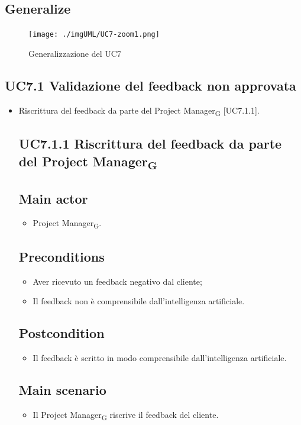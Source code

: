 \documentclass{article}
\begin{document}
    \subsection*{Generalize}
      \begin{figure}[h]
            \centering
            \texttt{[image: ./imgUML/UC7-zoom1.png]}
            \caption{Generalizzazione del UC7}
            \label{fig:UC7_generalizzazione}
        \end{figure}
    \subsection{UC7.1 Validazione del feedback non approvata}
    \begin{itemize}
        \item Riscrittura del feedback da parte del Project Manager\textsubscript{G}  [UC7.1.1].
        \subsection*{UC7.1.1 Riscrittura del feedback da parte del Project Manager\textsubscript{G} }
     \subsection*{Main actor}
         \begin{itemize}
             \item Project Manager\textsubscript{G}.
         \end{itemize}
     \subsection*{Preconditions} 
        \begin{itemize}
            \item Aver ricevuto un feedback negativo dal cliente;
            \item Il feedback non è comprensibile dall'intelligenza artificiale.
        \end{itemize}
        \subsection*{Postcondition} 
        \begin{itemize}
            \item Il feedback è scritto in modo comprensibile dall'intelligenza artificiale.
        \end{itemize}
        \subsection*{Main scenario}
        \begin{itemize}
        \item Il Project Manager\textsubscript{G} riscrive il feedback del cliente.
        \end{itemize}
    \end{itemize}
    
\end{document}
